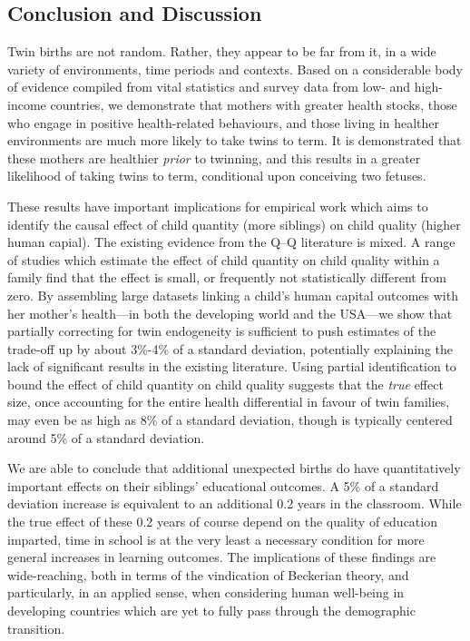 \documentclass[subeqn]{article}
\begin{document}
\begin{spacing}{1.4}
\section{Conclusion and Discussion}                   \label{TWINscn:conclusion}
Twin births are not random.  Rather, they appear to be far from it, in a wide
variety of environments, time periods and contexts.  Based on a considerable 
body of evidence compiled from vital statistics and survey data from low- and 
high-income countries, we demonstrate that mothers with greater health stocks,
those who engage in positive health-related behaviours, and those living in 
healther environments are much more likely to take twins to term.  It is 
demonstrated that these mothers are healthier \emph{prior} to twinning, and
this results in a greater likelihood of taking twins to term, conditional upon
conceiving two fetuses.

These results have important implications for empirical work which aims to 
identify the causal effect of child quantity (more siblings) on child quality
(higher human capial).  The existing evidence from the Q--Q literature is 
mixed.  A range of studies which estimate the effect of child quantity on child 
quality within a family find that the effect is small, or frequently not 
statistically different from zero.  By assembling large datasets linking a 
child's human capital outcomes with her mother's health---in both the developing 
world and the USA---we show that partially correcting for twin endogeneity is 
sufficient to push estimates of the trade-off up by about 3\%-4\% of a standard 
deviation, potentially explaining the lack of significant results in the 
existing literature.  Using partial identification to bound the effect of child 
quantity on child quality suggests that the \emph{true} effect size, once 
accounting for the entire health differential in favour of twin families, may 
even be as high as 8\% of a standard deviation, though is typically centered
around 5\% of a standard deviation.

We are able to conclude that additional unexpected births do have
quantitatively important effects on their siblings' educational outcomes.  
A 5\% of a standard deviation increase is equivalent to an additional 0.2
years in the classroom.  While the true effect of these 0.2 years of course
depend on the quality of education imparted, time in school is at the very 
least a necessary condition for more general increases in learning outcomes.  
The implications of these findings are wide-reaching, both in terms of the 
vindication of Beckerian theory, and particularly, in an applied sense, when 
considering human well-being in developing countries which are yet to fully 
pass through the demographic transition.


\end{spacing}
\end{document}
